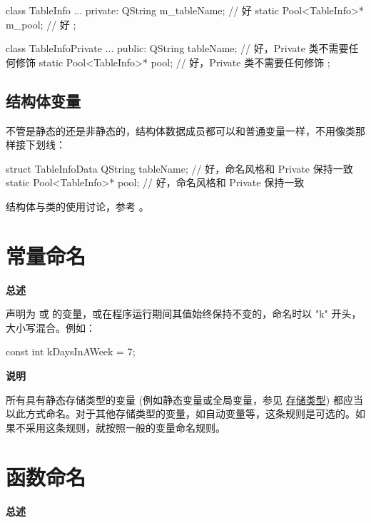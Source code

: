\begin{cppcode}
  class TableInfo {
      ...
      private:
      QString m_tableName;               // 好
      static Pool<TableInfo>* m_pool;    // 好
    };

  class TableInfoPrivate {
      ...
      public:
      QString tableName;               // 好，Private 类不需要任何修饰
      static Pool<TableInfo>* pool;    // 好，Private 类不需要任何修饰
    };
\end{cppcode}

\subsection{结构体变量}

不管是静态的还是非静态的，结构体数据成员都可以和普通变量一样，不用像类那样接下划线：

\begin{cppcode}
  struct TableInfoData {
      QString tableName;               // 好，命名风格和 Private 保持一致
      static Pool<TableInfo>* pool;    // 好，命名风格和 Private 保持一致
    }
\end{cppcode}

结构体与类的使用讨论，参考 。

\section{常量命名} \label{constant-names}

\textbf{总述}

声明为  或  的变量，或在程序运行期间其值始终保持不变的，命名时以 "k" 开头，大小写混合。例如：

\begin{cppcode}
  const int kDaysInAWeek = 7;
\end{cppcode}

\textbf{说明}

所有具有静态存储类型的变量 (例如静态变量或全局变量，参见 \href{http://en.cppreference.com/w/cpp/language/storage_duration#Storage_duration}{存储类型}) 都应当以此方式命名。对于其他存储类型的变量，如自动变量等，这条规则是可选的。如果不采用这条规则，就按照一般的变量命名规则。

\section{函数命名} \label{function-names}

\textbf{总述}


